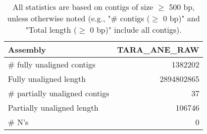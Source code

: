 \documentclass[12pt,a4paper]{article}
\begin{document}
\begin{table}[ht]
\begin{center}
\caption{All statistics are based on contigs of size $\geq$ 500 bp, unless otherwise noted (e.g., "\# contigs ($\geq$ 0 bp)" and "Total length ($\geq$ 0 bp)" include all contigs).}
\begin{tabular}{|l*{1}{|r}|}
\hline
Assembly & TARA\_ANE\_RAW \\ \hline
\# fully unaligned contigs & 1382202 \\ \hline
Fully unaligned length & 2894802865 \\ \hline
\# partially unaligned contigs & 37 \\ \hline
Partially unaligned length & 106746 \\ \hline
\# N's & 0 \\ \hline
\end{tabular}
\end{center}
\end{table}
\end{document}
